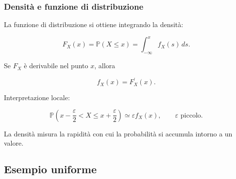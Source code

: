 \documentclass[handout]{beamer}%
\providecommand{\Prob}{\mathbb{P}}
\providecommand{\1}{\mathbf{1}}
\providecommand{\QTR}[2]{\csname #1\endcsname{#2}}
\begin{document}
\begin{frame}%
%

\frametitle{Densit\`{a} e funzione di distribuzione}%


La funzione di distribuzione si ottiene integrando la densit\`{a}:%

\[
F_{X}(x) = \Prob(X\leq x) = \int_{-\infty}^{x} f_{X}(s)\,ds.
\]


\medskip

Se $F_{X}$ \`{e} derivabile nel punto $x$, allora%

\[
f_{X}(x)=F_{X}^{\prime}(x).
\]


\medskip

Interpretazione locale:%

\[
\Prob\left( x-\frac{\varepsilon}{2}<X\leq x+\frac{\varepsilon}{2}\right)
\simeq\varepsilon f_{X}(x), \qquad\varepsilon\mbox{ piccolo}.
\]


\medskip

La densit\`{a} misura la rapidit\`{a} con cui la probabilit\`{a} si accumula
intorno a un valore.%

\transboxout
\end{frame}%




\subsection{Esempio uniforme}%
\end{document}
